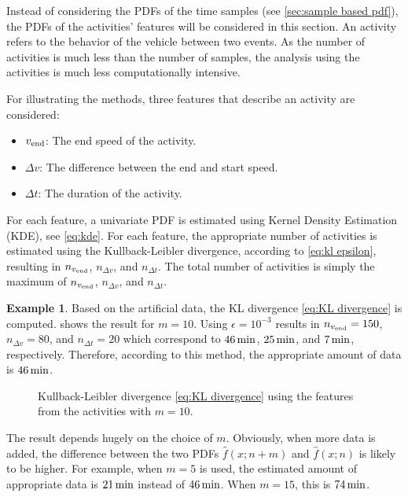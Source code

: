 \documentclass[10pt,final,a4paper,oneside,onecolumn]{article}
\newlength\figurewidth
\newlength\figureheight
\theoremstyle{plain}\newtheorem{definition}{Definition}[section]    %
\theoremstyle{definition}\newtheorem{example}{Example}[section]     %
\theoremstyle{remark}\newtheorem{remarkenv}{Remark}[section]        %
\begin{document}
Instead of considering the PDFs of the time samples (see \cref{sec:sample based pdf}), the PDFs of the activities' features will be considered in this section. An activity refers to the behavior of the vehicle between two events. As the number of activities is much less than the number of samples, the analysis using the activities is much less computationally intensive.

For illustrating the methods, three features that describe an activity are considered:
\begin{itemize}
	\item $v_{\textup{end}}$: The end speed of the activity.
	\item $\Delta v$: The difference between the end and start speed.
	\item $\Delta t$: The duration of the activity.
\end{itemize}

For each feature, a univariate PDF is estimated using Kernel Density Estimation (KDE), see \cref{eq:kde}. For each feature, the appropriate number of activities is estimated using the Kullback-Leibler divergence, according to \cref{eq:kl epsilon}, resulting in $n_{v_{\textup{end}}}$, $n_{\Delta v}$, and $n_{\Delta t}$. The total number of activities is simply the maximum of $n_{v_{\textup{end}}}$, $n_{\Delta v}$, and $n_{\Delta t}$.

\begin{example}
	Based on the artificial data, the KL divergence \cref{eq:KL divergence} is computed.  shows the result for $m=10$. Using $\epsilon = 10^{-3}$ results in $n_{v_{\textup{end}}}=150$, $n_{\Delta v}=80$, and $n_{\Delta t}=20$ which correspond to $\unit[46]{min}$, $\unit[25]{min}$, and $\unit[7]{min}$, respectively. Therefore, according to this method, the appropriate amount of data is $\unit[46]{min}$. 
	
	\setlength{}
	\setlength\figureheight{0.7\figurewidth}
	\begin{figure}
		\centering
		\caption{Kullback-Leibler divergence \cref{eq:KL divergence} using the features from the activities with $m=10$.}
		\label{fig:kl activity based}
	\end{figure}

	The result depends hugely on the choice of $m$. Obviously, when more data is added, the difference between the two PDFs $\hat{f}(x;n+m)$ and $\hat{f}(x;n)$ is likely to be higher. For example, when $m=5$ is used, the estimated amount of appropriate data is $\unit[21]{min}$ instead of $\unit[46]{min}$. When $m=15$, this is $\unit[74]{min}$.
\end{example}
\end{document}
